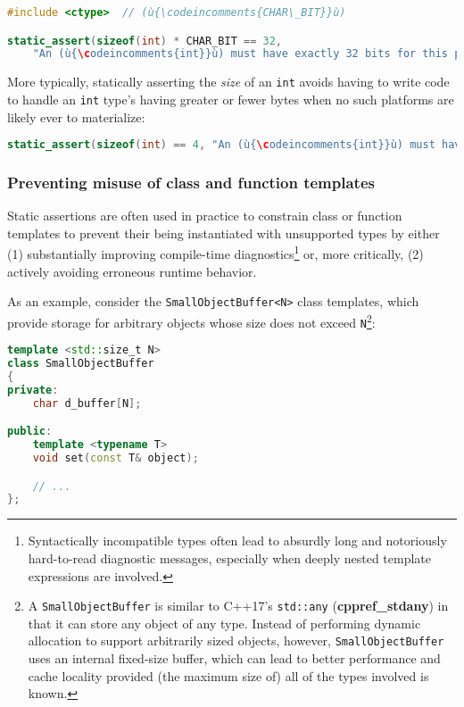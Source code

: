 \begin{lstlisting}[language=C++]
#include <ctype>  // (ù{\codeincomments{CHAR\_BIT}}ù)

static_assert(sizeof(int) * CHAR_BIT == 32,
    "An (ù{\codeincomments{int}}ù) must have exactly 32 bits for this program to work correctly.");
\end{lstlisting}
    
\noindent More typically, statically asserting the \emph{size} of an \texttt{int}
avoids having to write code to handle an \texttt{int} type's having
greater or fewer bytes when no such platforms are likely ever to
materialize:

\begin{lstlisting}[language=C++]
static_assert(sizeof(int) == 4, "An (ù{\codeincomments{int}}ù) must have exactly 4 bytes.");
\end{lstlisting}
    

\subsubsection[Preventing misuse of class and function templates]{Preventing misuse of class and function templates}\label{preventing-misuse-of-class-and-function-templates}

Static assertions are often used in practice to constrain class or
function templates to prevent their being instantiated with unsupported
types by either (1) substantially improving compile-time
diagnostics{\cprotect\footnote{Syntactically incompatible types often
lead to absurdly long and notoriously hard-to-read diagnostic messages, especially when deeply nested template expressions are involved.}} or, more critically, (2) actively avoiding
erroneous runtime behavior.

As an example, consider the \texttt{SmallObjectBuffer<N>} class
templates, which provide storage for arbitrary objects whose size does
not exceed \texttt{N}{\cprotect\footnote{A \texttt{SmallObjectBuffer} is
  similar to C++17's \texttt{std::any} (\textbf{{cppref\_stdany}}) in
  that it can store any object of any type. Instead of performing
  dynamic allocation to support arbitrarily sized objects, however,
  \texttt{SmallObjectBuffer} uses an internal fixed-size buffer, which
  can lead to better performance and cache locality provided (the
  maximum size of) all of the types involved is known.}}:

\begin{lstlisting}[language=C++]
template <std::size_t N>
class SmallObjectBuffer
{
private:
    char d_buffer[N];

public:
    template <typename T>
    void set(const T& object);

    // ...
};
\end{lstlisting}
    
